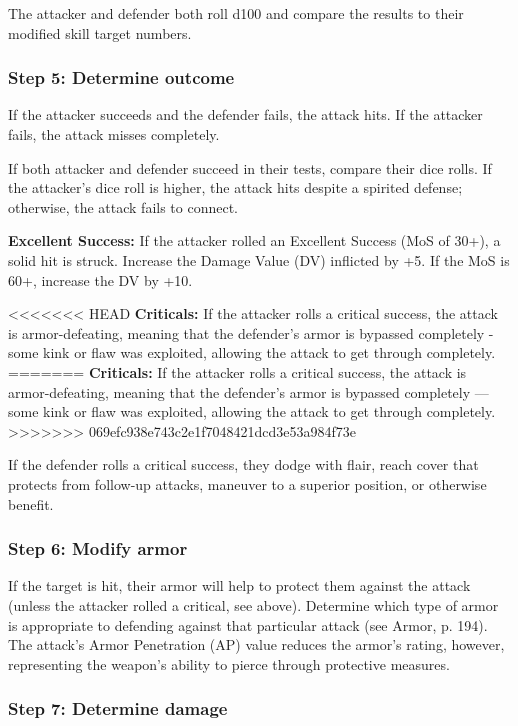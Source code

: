 The attacker and defender both roll d100 and compare the results to their modified skill target numbers.

\subsubsection{Step 5: Determine outcome}

If the attacker succeeds and the defender fails, the attack hits. If the attacker fails, the attack misses completely.

If both attacker and defender succeed in their tests, compare their dice rolls. If the attacker’s dice roll is higher, the attack hits despite a spirited defense; otherwise, the attack fails to connect.

\textbf{Excellent Success:} If the attacker rolled an Excellent Success (MoS of 30+), a solid hit is struck. Increase the Damage Value (DV) inflicted by +5. If the MoS is 60+, increase the DV by +10.

<<<<<<< HEAD
\textbf{Criticals:} If the attacker rolls a critical success, the attack is armor-defeating, meaning that the defender’s armor is bypassed completely - some kink or flaw was exploited, allowing the attack to get through completely.
=======
\textbf{Criticals:} If the attacker rolls a critical success, the attack is armor-defeating, meaning that the defender’s armor is bypassed completely --- some kink or flaw was exploited, allowing the attack to get through completely.
>>>>>>> 069efc938e743c2e1f7048421dcd3e53a984f73e

If the defender rolls a critical success, they dodge with flair, reach cover that protects from follow-up attacks, maneuver to a superior position, or otherwise benefit.

\subsubsection{Step 6: Modify armor}

If the target is hit, their armor will help to protect them against the attack (unless the attacker rolled a critical, see above). Determine which type of armor is appropriate to defending against that particular attack (see Armor, p. 194). The attack’s Armor Penetration (AP) value reduces the armor’s rating, however, representing the weapon’s ability to pierce through protective measures.

\subsubsection{Step 7: Determine damage}

